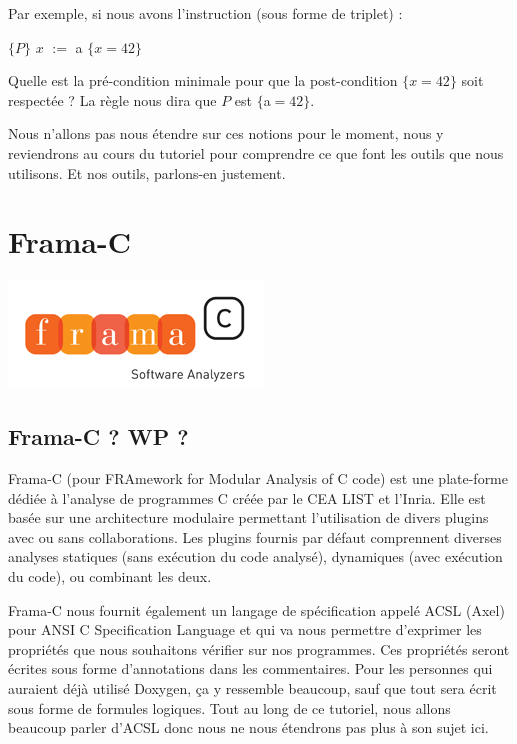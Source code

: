 \documentclass[12pt,francais,]{scrbook}
\begin{document}
Par exemple, si nous avons l'instruction (sous forme de triplet) :

\(\{P\}\) \(x\) \(:=\) a \(\{x = 42\}\)

Quelle est la pré-condition minimale pour que la post-condition
\(\{x = 42\}\) soit respectée ? La règle nous dira que \(P\) est
\(\{\)a\(=42\}\).

Nous n'allons pas nous étendre sur ces notions pour le moment, nous y
reviendrons au cours du tutoriel pour comprendre ce que font les outils
que nous utilisons. Et nos outils, parlons-en justement.

\section{Frama-C}\label{frama-c}

\begin{center}\includegraphics[scale=0.5]{framac.png}\end{center}

\subsection{Frama-C ? WP ?}\label{frama-c-wp}

Frama-C (pour FRAmework for Modular Analysis of C code) est une
plate-forme dédiée à l'analyse de programmes C créée par le CEA LIST et
l'Inria. Elle est basée sur une architecture modulaire permettant
l'utilisation de divers plugins avec ou sans collaborations. Les plugins
fournis par défaut comprennent diverses analyses statiques (sans
exécution du code analysé), dynamiques (avec exécution du code), ou
combinant les deux.

Frama-C nous fournit également un langage de spécification appelé ACSL
(\og{}Axel\fg{}) pour ANSI C Specification Language et qui va nous permettre
d'exprimer les propriétés que nous souhaitons vérifier sur nos
programmes. Ces propriétés seront écrites sous forme d'annotations dans
les commentaires. Pour les personnes qui auraient déjà utilisé Doxygen,
ça y ressemble beaucoup, sauf que tout sera écrit sous forme de formules
logiques. Tout au long de ce tutoriel, nous allons beaucoup parler
d'ACSL donc nous ne nous étendrons pas plus à son sujet ici.
\end{document}
